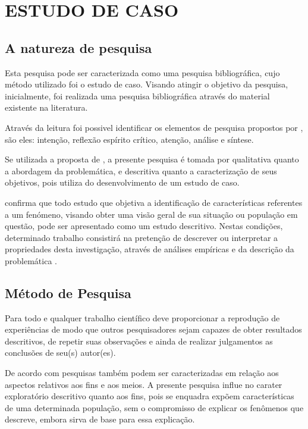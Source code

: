 \chapter{ESTUDO DE CASO}
\thispagestyle{empty}

\section{A natureza de pesquisa}

Esta pesquisa pode ser caracterizada como uma pesquisa bibliográfica, cujo método utilizado foi o estudo de caso. Visando atingir o objetivo da pesquisa, inicialmente, foi realizada uma pesquisa bibliográfica através do material existente na literatura.

Através da leitura foi possivel identificar os elementos de pesquisa propostos por , são eles: intenção, reflexão espírito crítico, atenção, análise e síntese.

Se utilizada a proposta de , a presente pesquisa é tomada por qualitativa quanto a abordagem da problemática, e descritiva quanto a caracterização de seus objetivos, pois utiliza do desenvolvimento de um estudo de caso.

 confirma que todo estudo que objetiva a identificação de características referentes a um fenómeno, visando obter uma visão geral de sua situação ou população em questão, pode ser apresentado como um estudo descritivo. Nestas condições, determinado trabalho consistirá na pretenção de descrever ou interpretar a propriedades desta investigação, através de análises empíricas e da descrição da problemática \cite{fortin2009fundamentos, lakatos2010fundamentos}.

\section{Método de Pesquisa}

Para  todo e qualquer trabalho científico deve proporcionar a reprodução de experiências de modo que outros pesquisadores sejam capazes de obter resultados descritivos, de repetir suas observações e ainda de realizar julgamentos as conclusões de seu(s) autor(es).

De acordo com  pesquisas também podem ser caracterizadas em relação aos aspectos relativos aos fins e aos meios. A presente pesquisa influe no carater exploratório descritivo quanto aos fins, pois se enquadra expõem características de uma determinada população, sem o compromisso de explicar os fenômenos que descreve, embora sirva de base para essa explicação.

